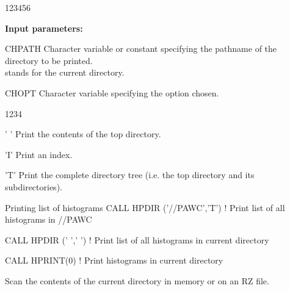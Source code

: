 \begin{DLtt}{123456}
\item[{\rm\bf Input parameters:}]
\item[CHPATH] Character variable or constant specifying 
              the pathname of the directory to be printed.\\
               stands for the current directory.
\item[CHOPT] Character variable specifying the option chosen.
\begin{DLtt}{1234}
\item[' '] Print the contents of the top directory.
\item['I'] Print an index.
\item['T'] Print the complete directory tree (i.e. the top
directory and its subdirectories).
\end{DLtt}
\end{DLtt}
 
\begin{XMPt}{Printing list of histograms} 
CALL HPDIR ('//PAWC','T') ! Print list of all histograms in //PAWC

CALL HPDIR (' ',' ')      ! Print list of all histograms in current directory

CALL HPRINT(0)            ! Print histograms in current directory
\end{XMPt}


 
\Action
Scan the contents of the current directory in memory or on an 
RZ file.
 
